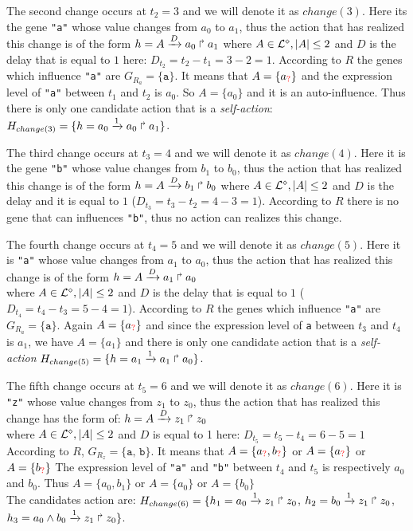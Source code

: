 The second change occurs at $t_2 = 3$ and we will denote it as $change(3)$.
Here its the gene \texttt{"a"} whose value changes from $a_0$ to $a_1$, thus the action that has realized this change is of the form
$h = A\xrightarrow{D} a_0 \Rsh a_1$ 
where $ A \in \mathcal{L}^{\diamond}, | A| \leq 2$ and $D$ is the delay that is equal to $1$ here: 
$D_{t_2}= t_2 - t_1 = 3 - 2= 1$.
According to $R$ the genes which influence \texttt{"a"} are $G_{R_a} = \{\texttt{a}\}$.
It means that $A= \{ a_{\textcolor{red}{?}}\}$ and the expression level of \texttt{"a"} between $t_1$ and $t_{2}$ is $a_0$.
So  $A= \{ a_0\} $ and it is an auto-influence. Thus there is only one candidate action that is a \emph{self-action}:
$H_{change(3)} = \{ h=a_0\xrightarrow{1} a_0 \Rsh a_1  \}$.

The third change occurs at $t_3 = 4$ and we will denote it as $change(4)$.
Here it is the gene \texttt{"b"} whose value changes from $b_1$ to $b_0$, thus the action that has realized this change is of the form 
$h = A\xrightarrow{D} b_1 \Rsh b_0$ where $ A \in \mathcal{L}^{\diamond}, | A| \leq 2$ and $D$ is the delay and it is equal to $1$ ($D_{t_3}= t_3 - t_2 = 4 - 3 = 1$).
According to $R$ there is no gene that can influences \texttt{"b"}, thus no action can realizes this change.

The fourth change occurs at $t_4 = 5$ and we will denote it as $change(5)$.
Here it is \texttt{"a"} whose value changes from $a_1$ to $a_0$, thus the action that has realized this change is of the form $h = A\xrightarrow{D} a_1 \Rsh a_0$ \\
where $ A \in \mathcal{L}^{\diamond}, | A| \leq 2$ and $D$ is the delay that is equal to $1$ ($D_{t_4}= t_4 - t_3 = 5 - 4= 1$).
According to $R$ the genes which influence \texttt{"a"} are $G_{R_a} = \{\texttt{a}\}$.
Again $A= \{ a_{\textcolor{red}{?}}\}$ and since the expression level of \texttt{a} between $t_3$ and $t_{4}$ is $a_1$,
we have $A= \{ a_1\} $ and there is only one candidate action that is a \emph{self-action}
$H_{change(5)} = \{ h=a_1\xrightarrow{1} a_1 \Rsh a_0 \}$.

The fifth change occurs at $t_5 = 6$ and we will denote it as $change(6)$.
Here it is \texttt{"z"} whose value changes from $z_1$ to $z_0$, thus the action that has realized this change has the form of:
$h = A\xrightarrow{D} z_1 \Rsh z_0$ \\
where $ A \in \mathcal{L}^{\diamond}, |A| \leq 2$ and $D$ is equal to 1 here:
$D_{t_5}= t_5 - t_4 = 6 - 5= 1$ \\
According to $R$, $G_{R_z} = \{\texttt{a, b}\}$.
It means that $A= \{ a_{\textcolor{red}{?}}, b_{\textcolor{red}{?}} \} $ or $A= \{ a_{\textcolor{red}{?}} \} $ or $A= \{ b_{\textcolor{red}{?}} \} $
The expression level of \texttt{"a"} and \texttt{"b"} between $t_4$ and $t_{5}$ is respectively $a_0$ and $b_0$.
Thus $A= \{ a_0, b_1 \} $ or $A= \{ a_0\} $ or $A= \{ b_0 \} $ \\
The candidates action are:
$H_{change(6)} = \{ h_1=a_0\xrightarrow{1} z_1 \Rsh z_0$, $  h_2=b_0\xrightarrow{1} z_1 \Rsh z_0$, $  h_3=a_0 \wedge b_0 \xrightarrow{1} z_1 \Rsh z_0 \}$.

